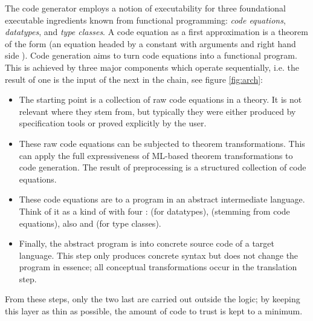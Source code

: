 \begin{isabellebody}
\begin{isamarkuptext}
  The code generator employs a notion of executability
  for three foundational executable ingredients known
  from functional programming:
  \emph{code equations}, \emph{datatypes}, and
  \emph{type classes}.  A code equation as a first approximation
  is a theorem of the form 
  (an equation headed by a constant  with arguments
   and right hand side ).
  Code generation aims to turn code equations
  into a functional program.  This is achieved by three major
  components which operate sequentially, i.e. the result of one is
  the input
  of the next in the chain,  see figure \ref{fig:arch}:

  \begin{itemize}

    \item The starting point is a collection of raw code equations in a
      theory. It is not relevant where they
      stem from, but typically they were either produced by specification
      tools or proved explicitly by the user.
      
    \item These raw code equations can be subjected to theorem transformations.  This
       can apply the full
      expressiveness of ML-based theorem transformations to code
      generation.  The result of preprocessing is a
      structured collection of code equations.

    \item These code equations are  to a program in an
      abstract intermediate language.  Think of it as a kind
      of  with four : 
      (for datatypes),  (stemming from code equations),
      also  and  (for type classes).

    \item Finally, the abstract program is  into concrete
      source code of a target language.
      This step only produces concrete syntax but does not change the
      program in essence; all conceptual transformations occur in the
      translation step.

  \end{itemize}

  \noindent From these steps, only the two last are carried out outside the logic;  by
  keeping this layer as thin as possible, the amount of code to trust is
  kept to a minimum.%
\end{isamarkuptext}%
\isamarkuptrue%
%
\isadelimtheory
%
\endisadelimtheory
%
\isatagtheory
{}\isamarkupfalse%
%
\endisatagtheory
{\isafoldtheory}%
%
\isadelimtheory
%
\endisadelimtheory
\isanewline
\end{isabellebody}%
